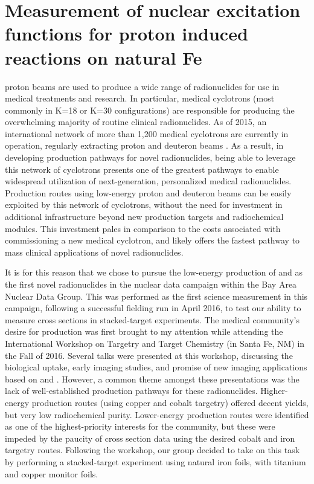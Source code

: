 \chapter{Measurement of nuclear excitation functions for proton induced reactions   on natural Fe}\label{sec:chapter_fe}


 proton beams are used to produce a wide range of radionuclides for use in medical treatments and research.
In particular, medical cyclotrons (most commonly in K=18 or K=30 configurations) are responsible for producing the overwhelming majority of routine clinical radionuclides.
As of 2015, an international network of more than 1,200 medical cyclotrons are currently in operation, regularly extracting proton and deuteron beams \cite{Goethals2015}.
As a result, in developing production pathways for novel radionuclides, being able to leverage this network of cyclotrons presents one of the greatest pathways to enable widespread utilization of next-generation, personalized medical radionuclides.
Production routes using low-energy proton and deuteron beams can be easily exploited by this network of cyclotrons, without the need for investment in additional infrastructure beyond new production targets and radiochemical modules.
This investment pales in comparison to the costs associated with commissioning a new medical cyclotron, and likely offers the fastest pathway to mass clinical applications of novel radionuclides.

It is for this reason that we chose to pursue the low-energy production of  and  as the first novel radionuclides in the nuclear data campaign within the Bay Area Nuclear Data Group.
This was performed as the first science measurement in this campaign, following a successful fielding run in April 2016, to test our ability to measure cross sections in stacked-target experiments.
The medical community's  desire for  production was first brought to my attention while attending the  International Workshop on Targetry and Target Chemistry (in Santa Fe, NM) in the Fall of 2016.
Several talks were presented at this workshop, discussing the biological uptake, early imaging studies, and promise of new imaging applications based on  and  \cite{Graves2016}. 
However, a common theme amongst these presentations was the lack of well-established production pathways for these radionuclides.
Higher-energy production routes (using copper and cobalt targetry) offered decent yields, but very low radiochemical purity.
Lower-energy production routes were identified as one of the highest-priority interests for the community, but these were impeded by the paucity of cross section data using the desired cobalt and iron targetry routes.
Following the workshop, our group decided to take on this task by  performing a stacked-target experiment using natural iron foils, with titanium and copper monitor foils.



